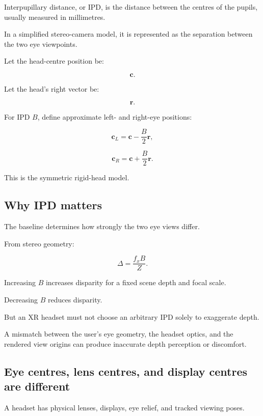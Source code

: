 Interpupillary distance, or IPD, is the distance between the centres of the pupils, usually measured in millimetres.

In a simplified stereo-camera model, it is represented as the separation between the two eye viewpoints.

Let the head-centre position be:

\[ \mathbf c. \]

Let the head's right vector be:

\[ \mathbf r. \]

For IPD \(B\), define approximate left- and right-eye positions:

\[ \boxed{ \mathbf c_L=\mathbf c-\frac B2\mathbf r, } \]

\[ \boxed{ \mathbf c_R=\mathbf c+\frac B2\mathbf r. } \]

This is the symmetric rigid-head model.

\subsection{Why IPD matters}\label{02-foundations-ii-ch035-why-ipd-matters}

\hypertarget{02-foundations-ii-ch035-why-ipd-matters}{}

The baseline determines how strongly the two eye views differ.

From stereo geometry:

\[ \Delta=\frac{f_xB}{Z}. \]

Increasing \(B\) increases disparity for a fixed scene depth and focal scale.

Decreasing \(B\) reduces disparity.

But an XR headset must not choose an arbitrary IPD solely to exaggerate depth.

A mismatch between the user's eye geometry, the headset optics, and the rendered view origins can produce inaccurate depth perception or discomfort.

\subsection{Eye centres, lens centres, and display centres are different}\label{02-foundations-ii-ch035-eye-centres-lens-centres-and-display-centres-are-different}

\hypertarget{02-foundations-ii-ch035-eye-centres-lens-centres-and-display-centres-are-different}{}

A headset has physical lenses, displays, eye relief, and tracked viewing poses.

